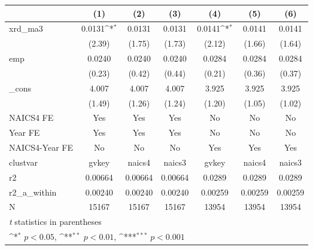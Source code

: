 {
\def\sym#1{\ifmmode^{#1}\else\(^{#1}\)\fi}
\begin{tabular}{l*{6}{c}}
\hline\hline
            &\multicolumn{1}{c}{(1)}         &\multicolumn{1}{c}{(2)}         &\multicolumn{1}{c}{(3)}         &\multicolumn{1}{c}{(4)}         &\multicolumn{1}{c}{(5)}         &\multicolumn{1}{c}{(6)}         \\
\hline
xrd\_ma3     &      0.0131\sym{*}  &      0.0131         &      0.0131         &      0.0141\sym{*}  &      0.0141         &      0.0141         \\
            &      (2.39)         &      (1.75)         &      (1.73)         &      (2.12)         &      (1.66)         &      (1.64)         \\
[1em]
emp         &      0.0240         &      0.0240         &      0.0240         &      0.0284         &      0.0284         &      0.0284         \\
            &      (0.23)         &      (0.42)         &      (0.44)         &      (0.21)         &      (0.36)         &      (0.37)         \\
[1em]
\_cons      &       4.007         &       4.007         &       4.007         &       3.925         &       3.925         &       3.925         \\
            &      (1.49)         &      (1.26)         &      (1.24)         &      (1.20)         &      (1.05)         &      (1.02)         \\
[1em]
NAICS4 FE   &         Yes         &         Yes         &         Yes         &          No         &          No         &          No         \\
[1em]
Year FE     &         Yes         &         Yes         &         Yes         &          No         &          No         &          No         \\
[1em]
NAICS4-Year FE&          No         &          No         &          No         &         Yes         &         Yes         &         Yes         \\
\hline
clustvar    &       gvkey         &      naics4         &      naics3         &       gvkey         &      naics4         &      naics3         \\
r2          &     0.00664         &     0.00664         &     0.00664         &      0.0289         &      0.0289         &      0.0289         \\
r2\_a\_within &     0.00240         &     0.00240         &     0.00240         &     0.00259         &     0.00259         &     0.00259         \\
N           &       15167         &       15167         &       15167         &       13954         &       13954         &       13954         \\
\hline\hline
\multicolumn{7}{l}{\footnotesize \textit{t} statistics in parentheses}\\
\multicolumn{7}{l}{\footnotesize \sym{*} \(p<0.05\), \sym{**} \(p<0.01\), \sym{***} \(p<0.001\)}\\
\end{tabular}
}
